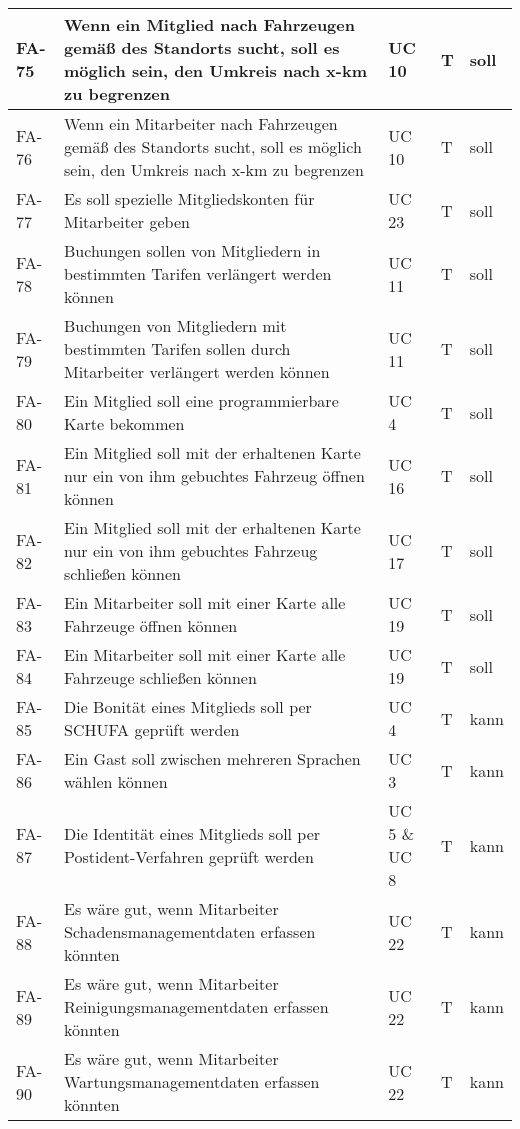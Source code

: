 \begin{longtable}{|m{1.5cm}|m{5.5cm}|P{3cm}|P{2cm}|P{1cm}|}
        \hline
        FA-75           & Wenn ein Mitglied nach Fahrzeugen gemäß des Standorts sucht, soll es möglich sein, den Umkreis nach x-km zu begrenzen & UC 10 & T & soll \\
        \hline
        FA-76           & Wenn ein Mitarbeiter nach Fahrzeugen gemäß des Standorts sucht, soll es möglich sein, den Umkreis nach x-km zu begrenzen & UC 10 & T & soll \\
        \hline
        FA-77           & Es soll spezielle Mitgliedskonten für Mitarbeiter geben & UC 23 & T & soll \\
        \hline
        FA-78           & Buchungen sollen von Mitgliedern in bestimmten Tarifen verlängert werden können & UC 11 & T & soll \\
        \hline
        FA-79           & Buchungen von Mitgliedern mit bestimmten Tarifen sollen durch Mitarbeiter verlängert werden können & UC 11 & T & soll \\
        \hline
        FA-80           & Ein Mitglied soll eine programmierbare Karte bekommen & UC 4 & T & soll \\
        \hline
        FA-81           & Ein Mitglied soll mit der erhaltenen Karte nur ein von ihm gebuchtes Fahrzeug öffnen können & UC 16 & T & soll \\
        \hline
        FA-82           & Ein Mitglied soll mit der erhaltenen Karte nur ein von ihm gebuchtes Fahrzeug schließen können & UC 17 & T & soll \\
        \hline
        FA-83           & Ein Mitarbeiter soll mit einer Karte alle Fahrzeuge öffnen können & UC 19 & T & soll \\
        \hline
        FA-84           & Ein Mitarbeiter soll mit einer Karte alle Fahrzeuge schließen können & UC 19 & T & soll \\
        \hline
        FA-85           & Die Bonität eines Mitglieds soll per SCHUFA geprüft werden & UC 4 & T & kann \\
        \hline
        FA-86           & Ein Gast soll zwischen mehreren Sprachen wählen können & UC 3 & T & kann \\
        \hline
        FA-87           & Die Identität eines Mitglieds soll per Postident-Verfahren geprüft werden & UC 5 \& UC 8 & T & kann \\
        \hline
        FA-88           & Es wäre gut, wenn Mitarbeiter Schadensmanagementdaten erfassen könnten & UC 22 & T & kann \\
        \hline
        FA-89           & Es wäre gut, wenn Mitarbeiter Reinigungsmanagementdaten erfassen könnten & UC 22 & T & kann \\
        \hline
        FA-90           & Es wäre gut, wenn Mitarbeiter Wartungsmanagementdaten erfassen könnten & UC 22 & T & kann \\
        \hline
    \end{longtable}\label{tab:Funktionale Anforderungen mit Use Case}

